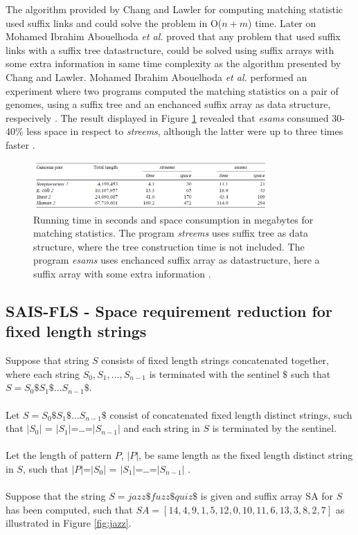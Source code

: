 \documentclass[12pt]{article} %
\begin{document}
The algorithm provided by Chang and Lawler \cite{enchancedsuffix} for computing matching statistic used suffix links and could solve the problem in O($n+m$) time. Later on Mohamed Ibrahim Abouelhoda \emph{et al.} \cite{enchancedsuffix} proved that any problem that used suffix links with a suffix tree datastructure, could be solved using suffix arrays with some extra information in same time complexity as the algorithm presented by Chang and Lawler\cite{enchancedsuffix}. Mohamed Ibrahim Abouelhoda \emph{et al.} performed an experiment where two programs computed the matching statistics on a pair of genomes, using a suffix tree and an enchanced suffix array as data structure, respecively \cite{enchancedsuffix}. The result displayed in Figure \ref{fig:matchingtest} revealed that \emph{esams} consumed 30-40\% less space in respect to \emph{streems}, although the latter were up to three times faster \cite{enchancedsuffix}.  

\begin{figure}[H]
    \centering
    \includegraphics[width=0.8\textwidth]{matchingtest}
    \captionsetup{width=0.8
    \textwidth}
    \caption{Running time in seconds and space consumption in megabytes for matching statistics. The program \emph{streems} uses suffix tree as data structure, where the tree construction time is not included. The program \emph{esams} uses enchanced suffix array as datastructure, here a suffix array with some extra information \cite{enchancedsuffix}. }
    \label{fig:matchingtest}
\end{figure}


\subsection{SAIS-FLS - Space requirement reduction for fixed length strings}

Suppose that string $S$ consists of fixed length strings concatenated together, where each string $S_0,S_1,...,S_{n-1}$ is terminated with the sentinel $\$$ such that $S=S_0\$S_1\$...S_{n-1}\$ $.
\\ \\
Let $S=S_0\$S_1\$...S_{n-1}\$ $ consist of concatenated fixed length distinct strings, such that $|S_0|$ = $|S_1|$=…=$|S_{n-1}|$ and each string in $S$ is terminated by the sentinel.
\\ \\
Let the length of pattern $P$, $|P|$, be same length as the fixed length distinct string in $S$, such that $|P|$=$|S_0|$ = $|S_1|$=…=$|S_{n-1}|$ .
\\ \\
Suppose that the string $S=jazz\$fuzz\$quiz\$$  is given and suffix array SA for $S$ has been computed, such that $SA=[14,4,9,1,5,12,0,10,11,6,13,3,8,2,7]$ as illustrated in Figure \ref{fig:jazz}.
\end{document}
